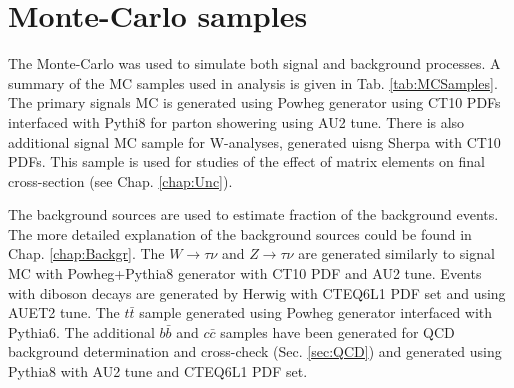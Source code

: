 \section{Monte-Carlo samples}

The Monte-Carlo was used to simulate both signal and background processes. A summary of the MC samples used in analysis is given in Tab. \ref{tab:MCSamples}. The primary signals MC is generated using Powheg generator using CT10\cite{NewPartonD} PDFs interfaced with Pythi8 for parton showering using AU2\cite{ATL-PHYS-PUB-2012-003} tune. There is also additional signal MC sample for W-analyses, generated uisng Sherpa with CT10 PDFs. This sample is used for studies of the effect of matrix elements on final cross-section (see Chap. \ref{chap:Unc}).

The background sources are used to estimate fraction of the background events. The more detailed explanation of the background sources could be found in Chap. \ref{chap:Backgr}. The $W\to \tau\nu$ and $Z \to \tau\nu$ are generated similarly to signal MC with Powheg+Pythia8 generator with CT10 PDF and AU2 tune. Events with diboson decays are generated by Herwig with CTEQ6L1\cite{Pumplin2002} PDF set and using AUET2\cite{ATL-PHYS-PUB-2010-014} tune. The $t\bar{t}$ sample generated using Powheg generator interfaced with Pythia6. The additional $b\bar{b}$ and $c\bar{c}$ samples have been generated for QCD background determination and cross-check (Sec. \ref{sec:QCD}) and generated using Pythia8 with AU2 tune and CTEQ6L1 PDF set.



